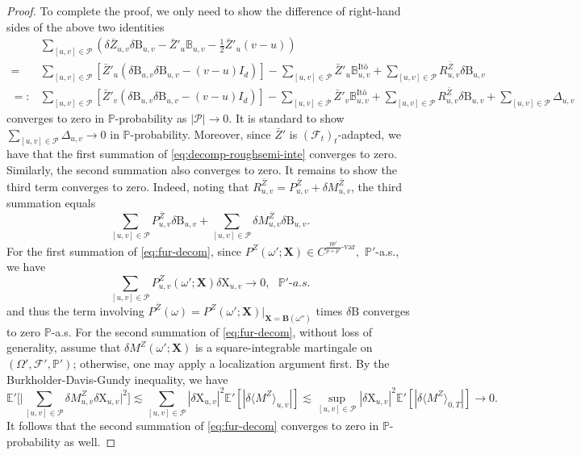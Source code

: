 \documentclass[11pt,reqno]{amsart}
\newcommand{\B}{{\mathbb{B}}}
\newcommand{\BX}{{\mathbf{X}}}
\newcommand{\BB}{{\mathbf{B}}}
\newcommand{\MF}{{\mathcal{F}}}
\newcommand{\MP}{{\mathcal{P}}}
\numberwithin{equation}{section}
\def\PP{{\mathbb P}}
\def\E{\mathbb E}
\begin{document}
\begin{proof}
To complete the proof, we only need to show the difference of right-hand sides of the above two identities 
\begin{align}\nonumber
&  \sum_{[u,v] \in \MP } (\delta \bar Z_{u,v} \delta \mathrm B_{u,v} - \bar Z'_u \B_{u,v} -\frac12 \bar Z'_u(v-u))\\ \nonumber
= & \sum_{[u,v] \in \MP }  \left[ \bar Z'_u (\delta \mathrm B_{u,v} \delta \mathrm B_{u,v} - (v-u)I_d) \right]  -  \sum_{[u,v] \in \MP } \bar Z'_u \B^{\text{It\^o}}_{u,v} + \sum_{[u,v] \in \MP } R^{\bar Z}_{u,v} \delta \mathrm B_{u,v}\\ \label{eq:decomp-roughsemi-inte}
=: &\sum_{[u,v] \in \MP }  \left[ \bar Z'_v (\delta \mathrm B_{u,v} \delta \mathrm B_{u,v} - (v-u) I_d) \right]  -  \sum_{[u,v] \in \MP } \bar Z'_v \B^{\text{It\^o}}_{u,v} + \sum_{[u,v] \in \MP } R^{\bar Z}_{u,v} \delta \mathrm B_{u,v} + \sum_{[u,v] \in \MP } \Delta_{u,v}
\end{align}
converges to zero in $\PP$-probability as $|\MP|\rightarrow 0$. It is standard to show $\sum_{[u,v]\in \MP} \Delta_{u,v}\to 0$  in $\PP$-probability. Moreover, since $\bar Z'$ is $(\MF_t)_t$-adapted, we have that the first summation of \eqref{eq:decomp-roughsemi-inte} converges to zero. Similarly, the second summation also converges to zero. It remains to show the third term converges to zero. Indeed, noting that $ R^{\bar Z}_{u,v} = P^{\bar Z}_{u,v} + \delta M^{\bar Z}_{u,v}$, the third summation equals
\begin{equation}\label{eq:fur-decom}
\sum_{[u,v]\in \MP} P^{\bar Z}_{u,v} \delta \mathrm B_{u,v} + \sum_{[u,v]\in \MP} \delta M^{\bar Z}_{u,v} \delta \mathrm B_{u,v}.   
\end{equation}
For the first summation of \eqref{eq:fur-decom}, since  $P^{Z}(\omega';\BX) \in C^{\frac{pp'}{p+p'}\text{-var}},$ $\PP'$-a.s., we have 
$$
\sum_{[u,v]\in \MP}   P^{Z}_{u,v}(\omega';\BX) \delta \mathrm X_{u,v} \rightarrow 0, \ \ \  \PP'\text{-}a.s.
$$
and thus the term involving $P^{\bar Z}(\omega)= P^Z(\omega';\BX)|_{\BX=\BB(\omega'')}$ times $\delta \mathrm B$ converges to zero $\PP$-a.s. For the second summation of \eqref{eq:fur-decom}, without loss of generality, assume that $\delta M^Z (\omega';\BX)$ is a square-integrable martingale on $(\Omega', \MF', \PP')$; otherwise, one may apply a localization argument first. By the Burkholder-Davis-Gundy inequality, we have 
$$
\E'\Big[ \Big|\sum_{[u,v]\in \MP} \delta  {M}^Z_{u,v} \delta \mathrm X_{u,v} \Big|^2 \Big] \lesssim \sum_{[u,v] \in \MP} |\delta \mathrm X_{u,v}|^2 \E' \left[|\delta \langle M^Z \rangle_{u,v}|\right] \lesssim \sup_{[u,v] \in \MP} |\delta \mathrm X_{u,v}|^2 \E'\left[ | \delta \langle M^Z \rangle_{0,T} |\right] \rightarrow 0. 
$$
It follows that the second summation of \eqref{eq:fur-decom} converges to zero in $\PP$-probability as well.    
\end{proof}
\end{document}
